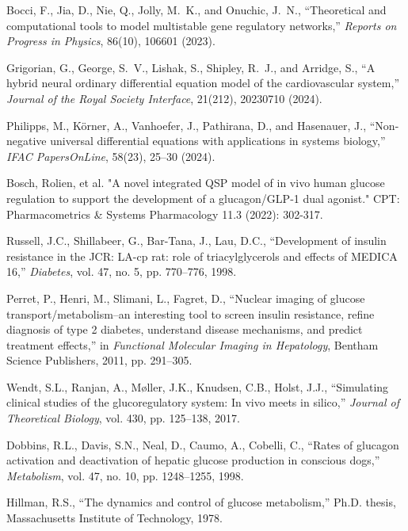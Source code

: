 \documentclass[9pt,shortpaper,twoside,web]{ieeecolor}
\begin{document}
\begin{thebibliography}{00}
Bocci, F., Jia, D., Nie, Q., Jolly, M.~K., and Onuchic, J.~N.,
``Theoretical and computational tools to model multistable gene regulatory networks,''
\textit{Reports on Progress in Physics}, 86(10), 106601 (2023).

Grigorian, G., George, S.~V., Lishak, S., Shipley, R.~J., and Arridge, S.,
``A hybrid neural ordinary differential equation model of the cardiovascular system,''
\textit{Journal of the Royal Society Interface}, 21(212), 20230710 (2024).

Philipps, M., Körner, A., Vanhoefer, J., Pathirana, D., and Hasenauer, J.,
``Non-negative universal differential equations with applications in systems biology,''
\textit{IFAC PapersOnLine}, 58(23), 25–30 (2024).

Bosch, Rolien, et al. "A novel integrated QSP model of in vivo human glucose regulation to support the development of a glucagon/GLP‐1 dual agonist." CPT: Pharmacometrics \& Systems Pharmacology 11.3 (2022): 302-317.

Russell, J.C., Shillabeer, G., Bar-Tana, J., Lau, D.C., ``Development of insulin resistance in the JCR: LA-cp rat: role of triacylglycerols and effects of MEDICA 16,'' \textit{Diabetes}, vol. 47, no. 5, pp. 770--776, 1998.

Perret, P., Henri, M., Slimani, L., Fagret, D., ``Nuclear imaging of glucose transport/metabolism--an interesting tool to screen insulin resistance, refine diagnosis of type 2 diabetes, understand disease mechanisms, and predict treatment effects,'' in \textit{Functional Molecular Imaging in Hepatology}, Bentham Science Publishers, 2011, pp. 291--305.

Wendt, S.L., Ranjan, A., Møller, J.K., Knudsen, C.B., Holst, J.J., ``Simulating clinical studies of the glucoregulatory system: In vivo meets in silico,'' \textit{Journal of Theoretical Biology}, vol. 430, pp. 125--138, 2017.

Dobbins, R.L., Davis, S.N., Neal, D., Caumo, A., Cobelli, C., ``Rates of glucagon activation and deactivation of hepatic glucose production in conscious dogs,'' \textit{Metabolism}, vol. 47, no. 10, pp. 1248--1255, 1998.

Hillman, R.S., ``The dynamics and control of glucose metabolism,'' Ph.D. thesis, Massachusetts Institute of Technology, 1978.


\end{thebibliography}
\end{document}
